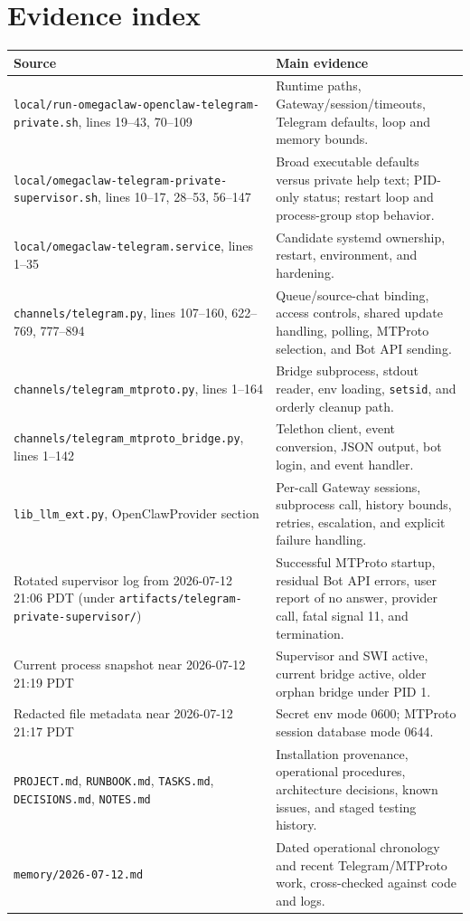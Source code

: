 \documentclass[10pt]{article}
\newcommand{\code}[1]{\texttt{#1}}
\begin{document}
\section{Evidence index}

\begin{longtable}{p{}p{}}
\toprule
Source & Main evidence \\
\midrule
\endhead
\code{local/run-omegaclaw-openclaw-telegram-private.sh}, lines 19--43, 70--109 & Runtime paths, Gateway/session/timeouts, Telegram defaults, loop and memory bounds. \\
\code{local/omegaclaw-telegram-private-supervisor.sh}, lines 10--17, 28--53, 56--147 & Broad executable defaults versus private help text; PID-only status; restart loop and process-group stop behavior. \\
\code{local/omegaclaw-telegram.service}, lines 1--35 & Candidate systemd ownership, restart, environment, and hardening. \\
\code{channels/telegram.py}, lines 107--160, 622--769, 777--894 & Queue/source-chat binding, access controls, shared update handling, polling, MTProto selection, and Bot API sending. \\
\code{channels/telegram\_mtproto.py}, lines 1--164 & Bridge subprocess, stdout reader, env loading, \code{setsid}, and orderly cleanup path. \\
\code{channels/telegram\_mtproto\_bridge.py}, lines 1--142 & Telethon client, event conversion, JSON output, bot login, and event handler. \\
\code{lib\_llm\_ext.py}, OpenClawProvider section & Per-call Gateway sessions, subprocess call, history bounds, retries, escalation, and explicit failure handling. \\
Rotated supervisor log from 2026-07-12 21:06 PDT (under \code{artifacts/telegram-private-supervisor/}) & Successful MTProto startup, residual Bot API errors, user report of no answer, provider call, fatal signal 11, and termination. \\
Current process snapshot near 2026-07-12 21:19 PDT & Supervisor and SWI active, current bridge active, older orphan bridge under PID 1. \\
Redacted file metadata near 2026-07-12 21:17 PDT & Secret env mode 0600; MTProto session database mode 0644. \\
\code{PROJECT.md}, \code{RUNBOOK.md}, \code{TASKS.md}, \code{DECISIONS.md}, \code{NOTES.md} & Installation provenance, operational procedures, architecture decisions, known issues, and staged testing history. \\
\code{memory/2026-07-12.md} & Dated operational chronology and recent Telegram/MTProto work, cross-checked against code and logs. \\
\bottomrule
\end{longtable}
\end{document}
